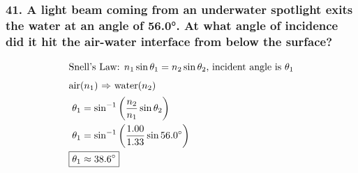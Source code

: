 \documentclass{article}
\newcommand{\bp}[1]{\left(#1\right)}
\begin{document}
\subsubsection*{
    41. A light beam coming from an underwater spotlight exits the water at an angle
    of 56.0°. At what angle of incidence did it hit the air-water interface from below
    the surface?
}
\begin{align*}
    \intertext{Snell's Law: $n_1\sin\theta_1 = n_2\sin\theta_2$, incident angle
    is $\theta_1$}
    \intertext{air($n_1$) $\Rightarrow$ water($n_2$)}
    \theta_1 &= \sin^{-1}\bp{\displaystyle\frac{n_2}{n_1}\sin\theta_2} \\
    \theta_1 &= \sin^{-1}\bp{\displaystyle\frac{1.00}{1.33}\sin 56.0\degree} \\
    \Aboxed{\theta_1 &\approx 38.6\degree}
\end{align*}
\newpage
\end{document}
